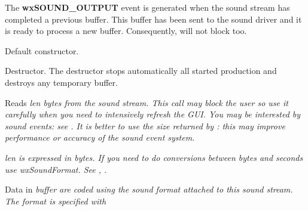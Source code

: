 The {\bf wxSOUND\_OUTPUT} event is generated when the sound stream has completed a
previous buffer. This buffer has been sent to the sound driver and it is ready to
process a new buffer. Consequently,  will not
block too.



\label{wxsoundstreamwxsoundstream}


Default constructor.

\label{wxsoundstreamdtor}


Destructor. The destructor stops automatically all started production and destroys
any temporary buffer.


\label{wxsoundstreamread}


Reads \it{len} bytes from the sound stream. This call may block the user so
use it carefully when you need to intensively refresh the GUI. You may be
interested by sound events: see
.
It is better to use the size returned by : this may improve performance or accuracy of the
sound event system.


\it{len} is expressed in bytes. If you need to do conversions between bytes
and seconds use wxSoundFormat.
See , .


Data in \it{buffer} are coded using the sound format attached to this sound 
stream. The format is specified with 


\label{wxsoundstreamwrite}

